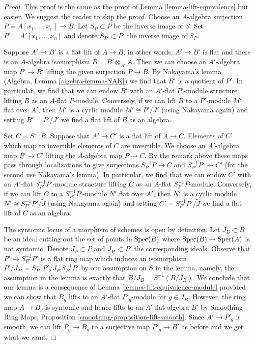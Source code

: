 \begin{proof}
This proof is the same as the proof of
Lemma \ref{lemma-lift-equivalence} but easier. We suggest the
reader to skip the proof.
Choose an $A$-algebra surjection $P = A[x_1, \ldots, x_n] \to B$.
Let $S_P \subset P$ be the inverse image of $S$.
Set $P' = A'[x_1, \ldots, x_n]$ and denote $S_{P'} \subset P'$
the inverse image of $S_P$.

\medskip\noindent
Suppose $A' \to B'$ is a flat lift of $A \to B$, in other words,
$A' \to B'$ is flat and there is an $A$-algebra isomorphism
$B = B' \otimes_{A'} A$. Then we can choose an $A'$-algebra map
$P' \to B'$ lifting the given surjection $P \to B$.
By Nakayama's lemma (Algebra, Lemma \ref{algebra-lemma-NAK})
we find that $B'$ is a quotient of $P'$. In particular, we find
that we can endow $B'$ with an $A'$-flat $P'$-module structure
lifting $B$ as an $A$-flat $P$-module.
Conversely, if we can lift $B$ to a $P'$-module $M'$ flat over $A'$,
then $M'$ is a cyclic module $M' \cong P'/J'$ (using Nakayama again)
and setting $B' = P'/J'$ we find a flat lift of $B$ as an algebra.

\medskip\noindent
Set $C = S^{-1}B$. Suppose that $A' \to C'$ is a flat lift of $A \to C$.
Elements of $C'$ which map to invertible elements of $C$ are invertible.
We choose an $A'$-algebra map $P' \to C'$ lifting
the $A$-algebra map $P \to C$. By the remark above
these maps pass through localizations to give surjections
$S_P^{-1}P \to C$ and $S_{P'}^{-1}P' \to C'$
(for the second use Nakayama's lemma).
In particular, we find that we can endow $C'$ with an $A'$-flat
$S_{P'}^{-1}P'$-module structure lifting $C$ as an $A$-flat
$S_P^{-1}P$-module. Conversely, if we can lift $C$ to a
$S_{P'}^{-1}P'$-module $N'$ flat over $A'$, then $N'$
is a cyclic module $N' \cong S_{P'}^{-1}P'/\tilde J$
(using Nakayama again) and setting $C' = S_{P'}^{-1}P'/\tilde J$
we find a flat lift of $C$ as an algebra.

\medskip\noindent
The syntomic locus of a morphism of schemes is open by definition.
Let $J_B \subset B$ be an ideal cutting out the set of points
in $\mathop{\mathrm{Spec}}(B)$ where $\mathop{\mathrm{Spec}}(B) \to \mathop{\mathrm{Spec}}(A)$ is not syntomic.
Denote $J_P \subset P$ and $J_{P'} \subset P'$ the corresponding
ideals. Observe that $P' \to S_{P'}^{-1}P'$ is a flat ring map which
induces an isomorphism $P'/J_{P'} = S_{P'}^{-1}P'/J_{P'}S_{P'}^{-1}P'$
by our assumption on $S$ in the lemma, namely, the assumption
in the lemma is exactly that $B/J_B = S^{-1}(B/J_B)$.
We conclude that our lemma is a consequence of
Lemma \ref{lemma-lift-equivalence-module} provided we can
show that $B_g$ lifts to an $A'$-flat $P'_g$-module for
$g \in J_B$. However, the ring map $A \to B_g$ is syntomic
and hence lifts to an $A'$-flat algebra $B'$ by
Smoothing Ring Maps, Proposition \ref{smoothing-proposition-lift-smooth}.
Since $A' \to P'_g$ is smooth, we can lift $P_g \to B_g$
to a surjective map $P'_g \to B'$ as before and we get what we want.
\end{proof}

